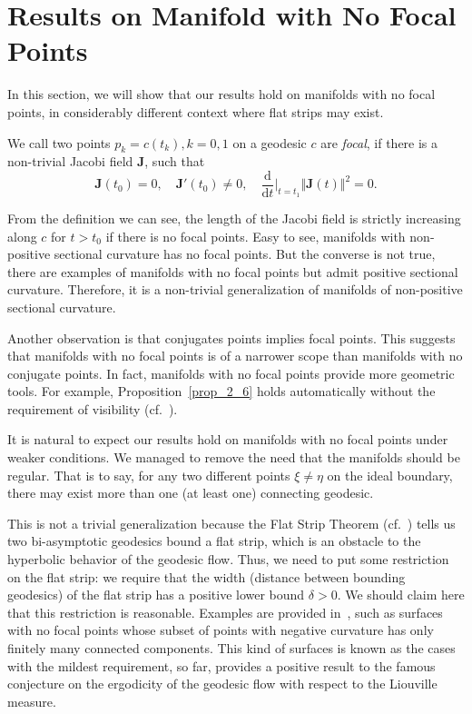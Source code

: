 \documentclass[reqno,11pt]{article}
\theoremstyle{definition}
\theoremstyle{remark}
\numberwithin{equation}{section}
\begin{document}
\section{Results on Manifold with No Focal Points}\label{sec7}

In this section, we will show that our results hold on manifolds with no focal points, in considerably different context where flat strips may exist. 

We call two points $p_k=c(t_k), k=0,1$ on a geodesic $c$ are \emph{focal}, if there is a non-trivial Jacobi field $\bm{J}$, such that
\begin{displaymath}
    \bm{J}(t_0)=0,\quad \bm{J}'(t_0)\neq 0,\quad \frac{\mathrm{d}}{\mathrm{d} {t}}\Big|_{t=t_1} {\Vert \bm{J}(t)\Vert}^2=0.
\end{displaymath}

From the definition we can see, the length of the Jacobi field is strictly increasing along $c$ for $t>t_0$ if there is no focal points. Easy to see, manifolds with non-positive sectional curvature has no focal points. But the converse is not true, there are examples of manifolds with no focal points but admit positive sectional curvature. Therefore, it is a non-trivial generalization of manifolds of non-positive sectional curvature. 

Another observation is that conjugates points implies focal points. This suggests that manifolds with no focal points is of a narrower scope than manifolds with no conjugate points. In fact, manifolds with no focal points provide more geometric tools. For example, Proposition~\ref{prop_2_6} holds automatically without the requirement of visibility (cf.~\cite{OS1}). 

It is natural to expect our results hold on manifolds with no focal points under weaker conditions. We managed to remove the need that the manifolds should be regular. That is to say, for any two different points $\xi\neq\eta$ on the ideal boundary, there may exist more than one (at least one) connecting geodesic. 

This is not a trivial generalization because the Flat Strip Theorem (cf.~\cite{OS1}) tells us two bi-asymptotic geodesics bound a flat strip, which is an obstacle to the hyperbolic behavior of the geodesic flow. Thus, we need to put some restriction on the flat strip: we require that the width (distance between bounding geodesics) of the flat strip has a positive lower bound $\delta>0$. We should claim here that this restriction is reasonable. Examples are provided in~\cite{LWW2}, such as surfaces with no focal points whose subset of points with negative curvature has only finitely many connected components. This kind of surfaces is known as the cases with the mildest requirement, so far, provides a positive result to the famous conjecture on the ergodicity of the geodesic flow with respect to the Liouville measure. 
\end{document}
